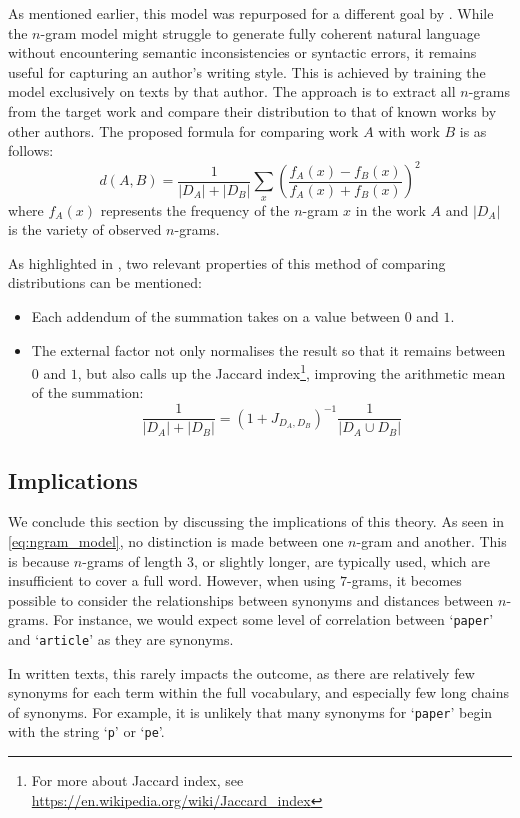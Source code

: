 \noindent As mentioned earlier, this model was repurposed for a different goal by \citet{SapAttribution}. While the $n$-gram model might struggle to generate fully coherent natural language without encountering semantic inconsistencies or syntactic errors, it remains useful for capturing an author's writing style. This is achieved by training the model exclusively on texts by that author. The approach is to extract all $n$-grams from the target work and compare their distribution to that of known works by other authors. The proposed formula for comparing work $A$ with work $B$ is as follows:
\begin{equation}
	d(A,B) = \frac{1}{|D_A|+|D_B|}\sum_x\left(\frac{f_A(x)-f_B(x)}{f_A(x)+f_B(x)}\right)^2
	\label{eq:SapAttribution_dist}
\end{equation}
where $f_A(x)$ represents the frequency of the $n$-gram $x$ in the work $A$ and $|D_A|$ is the variety of observed $n$-grams.

\noindent As highlighted in \cite{thesis}, two relevant properties of this method of comparing distributions can be mentioned:
\begin{itemize}
	\item Each addendum of the summation takes on a value between $0$ and $1$.
	\item The external factor not only normalises the result so that it remains between $0$ and $1$, but also calls up the Jaccard index\footnote{For more about Jaccard index, see \url{https://en.wikipedia.org/wiki/Jaccard_index}}, improving the arithmetic mean of the summation:
	\[
		\frac{1}{|D_A|+|D_B|} = (1+J_{D_A,D_B})^{-1}\frac{1}{|D_A\cup D_B|}
	\]
\end{itemize}

\subsection{Implications}
We conclude this section by discussing the implications of this theory. As seen in \cref{eq:ngram_model}, no distinction is made between one $n$-gram and another. This is because $n$-grams of length 3, or slightly longer, are typically used, which are insufficient to cover a full word. However, when using $7$-grams, it becomes possible to consider the relationships between synonyms and distances between $n$-grams. For instance, we would expect some level of correlation between ‘\texttt{paper}’ and ‘\texttt{article}’ as they are synonyms.

\noindent In written texts, this rarely impacts the outcome, as there are relatively few synonyms for each term within the full vocabulary, and especially few long chains of synonyms. For example, it is unlikely that many synonyms for ‘\texttt{paper}’ begin with the string ‘\texttt{p}’ or ‘\texttt{pe}’.

